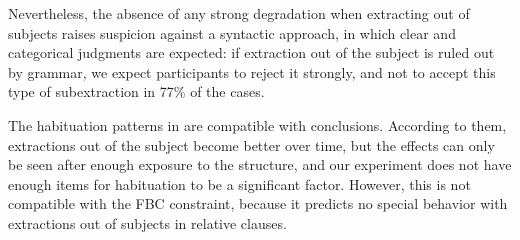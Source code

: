 Nevertheless, the absence of any strong degradation when extracting out of subjects raises suspicion against a syntactic approach, in which clear and categorical judgments are expected: if extraction out of the subject is ruled out by grammar, we expect participants to reject it strongly, and not to accept this type of subextraction in 77\% of the cases. 

The habituation patterns in  are compatible with  conclusions. According to them, extractions out of the subject become better over time, but the effects can only be seen after enough exposure to the structure, and our experiment does not have enough items for habituation to be a significant factor. However, this is not compatible with the FBC constraint, because it predicts no special behavior with extractions out of subjects in relative clauses.

